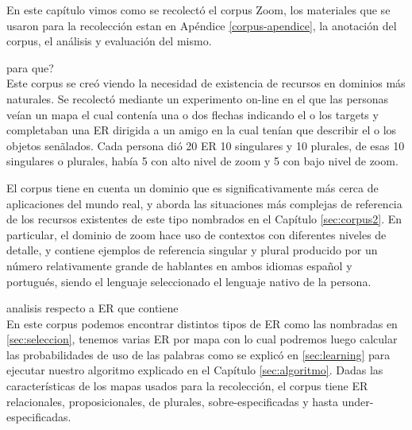 
En este cap\'itulo vimos como se recolect\'o el corpus Zoom, los materiales que se usaron para la recolecci\'on estan en Ap\'endice \ref{corpus-apendice}, la anotaci\'on del corpus, el an\'alisis y evaluaci\'on del mismo. 

para que?\\
Este corpus se cre\'o viendo la necesidad de existencia de recursos en dominios m\'as naturales. Se recolect\'o mediante un experimento on-line en el que las personas ve\'ian un mapa el cual conten\'ia una o dos flechas indicando el o los targets y completaban una ER dirigida a un amigo en la cual ten\'ian que describir el o los objetos sen\~alados. Cada persona di\'o 20 ER 10 singulares y 10 plurales, de esas 10 singulares o plurales, hab\'ia 5 con alto nivel de zoom y 5 con bajo nivel de zoom.

El corpus tiene en cuenta un dominio que es significativamente m\'as cerca de aplicaciones del mundo real, y aborda las situaciones m\'as complejas de referencia de los recursos existentes de este tipo nombrados en el Cap\'itulo \ref{sec:corpus2}. En particular, el dominio de zoom hace uso de contextos con diferentes niveles de detalle, y contiene ejemplos de referencia singular y plural producido por un n\'umero relativamente grande de hablantes en ambos idiomas espa\~nol y portugu\'es, siendo el lenguaje seleccionado el lenguaje nativo de la persona.

analisis respecto a ER que contiene\\
En este corpus podemos encontrar distintos tipos de ER como las nombradas en \ref{sec:seleccion}, tenemos varias ER por mapa con lo cual podremos luego calcular las probabilidades de uso de las palabras como se explic\'o en \ref{sec:learning} para ejecutar nuestro algoritmo explicado en el Cap\'itulo \ref{sec:algoritmo}. Dadas las caracter\'isticas de los mapas usados para la recolecci\'on, el corpus tiene ER relacionales, proposicionales, de plurales, sobre-especificadas y hasta under-especificadas.

